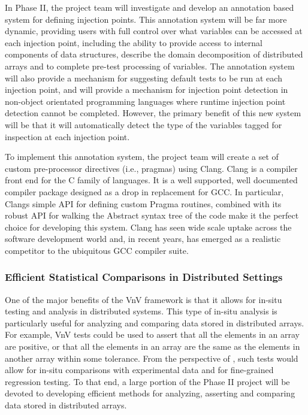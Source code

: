 In Phase II, the project team will investigate and develop an annotation based system for defining injection points. This annotation system will be far more dynamic, providing users with full control over what variables can be accessed at each injection point, including the ability to provide access to internal components of data structures, describe the domain decomposition of distributed arrays and to complete pre-test processing of variables. The annotation system will also provide a mechanism for suggesting default tests to be run at each injection point, and will provide a mechanism for injection point detection in non-object orientated programming languages where runtime injection point detection cannot be completed. However, the primary benefit of this new system will be that it will automatically detect the type of the variables tagged for inspection at each injection point.  

To implement this annotation system, the project team will create a set of custom pre-processor directives (i.e., pragmas) using Clang. Clang is a compiler front end for the C family of languages. It is a well supported, well documented compiler package designed as a drop in replacement for GCC. In particular, Clangs simple API for defining custom Pragma routines, combined with its robust API for walking the Abstract syntax tree of the code make it the perfect choice for developing this system. Clang has seen wide scale uptake across the software development world and, in recent years, has emerged as a realistic competitor to the ubiquitous GCC compiler suite.  

\subsubsection{Efficient Statistical Comparisons in Distributed Settings} 

One of the major benefits of the VnV framework is that it allows for in-situ testing and analysis in distributed systems. This type of in-situ analysis is particularly useful for analyzing and comparing data stored in distributed arrays. For example, VnV tests could be used to assert that all the elements in an array are positive, or that all the elements in an array are the same as the elements in another array within some tolerance. From the perspective of \VV, such tests would allow for in-situ comparisons with experimental data and for fine-grained regression testing. To that end, a large portion of the Phase II project will be devoted to developing efficient methods for analyzing, asserting and comparing data stored in distributed arrays. 

